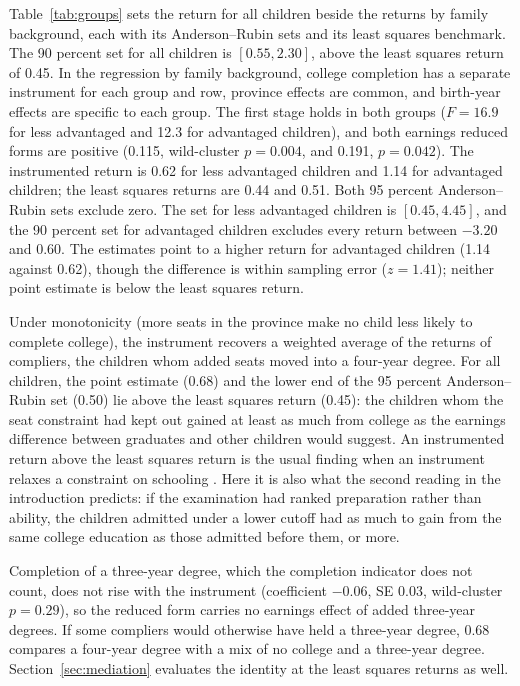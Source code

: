 \documentclass[11pt]{article}
\begin{document}
Table~\ref{tab:groups} sets the return for all children beside the returns by family background, each with its Anderson--Rubin sets and its least squares benchmark. The 90 percent set for all children is $[0.55, 2.30]$, above the least squares return of 0.45. In the regression by family background, college completion has a separate instrument for each group and row, province effects are common, and birth-year effects are specific to each group. The first stage holds in both groups
($F = 16.9$ for less advantaged and 12.3 for advantaged children), and
both earnings reduced forms are positive (0.115, wild-cluster
$p = 0.004$, and 0.191, $p = 0.042$). The instrumented return is 0.62
for less advantaged children and 1.14 for advantaged children; the least squares returns are 0.44 and 0.51. Both 95
percent Anderson--Rubin sets exclude zero. The set for less advantaged children is $[0.45, 4.45]$,
and the 90 percent set for advantaged children excludes every return between $-3.20$ and 0.60. The estimates point to a higher return for advantaged children (1.14 against 0.62), though the difference is within sampling error ($z = 1.41$); neither point estimate is below the least squares return.

Under monotonicity (more seats in the province make no child less likely to complete college), the instrument recovers a weighted average of the returns of compliers, the children whom added seats moved into a four-year degree. For all children, the point estimate (0.68) and the lower end of the 95 percent Anderson--Rubin set (0.50) lie above the least squares return (0.45): the children whom the seat constraint had kept out gained at least as much from college as the earnings difference between graduates and other children would suggest. An instrumented return above the least squares return is the usual
finding when an instrument relaxes a constraint on schooling
\citep{Card2001}. Here it is also what the second reading in the introduction predicts: if the examination had ranked preparation rather than ability,
the children admitted under a lower cutoff had as much to gain from the same college education as
those admitted before them, or more.

Completion of a three-year degree, which the
completion indicator does not count, does not rise with the instrument (coefficient $-0.06$, SE 0.03, wild-cluster $p = 0.29$), so the reduced form carries no earnings effect of added three-year degrees. If some compliers would otherwise have held a three-year degree, 0.68 compares a four-year degree with a mix of no college and a three-year degree. Section~\ref{sec:mediation} evaluates the identity at the least squares returns as well.
\end{document}
